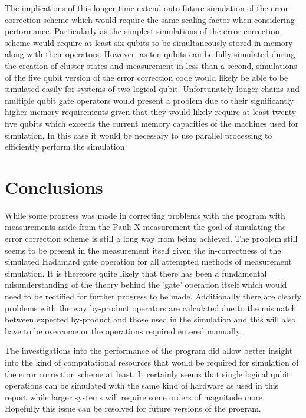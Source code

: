 The implications of this longer time extend onto future simulation of the error correction scheme which would require the same scaling factor when considering performance. Particularly as the simplest simulations of the error correction scheme would require at least six qubits to be simultaneously stored in memory along with their operators. However, as ten qubits can be fully simulated during the creation of cluster states and measurement in less than a second, simulations of the five qubit version of the error correction code would likely be able to be simulated easily for systems of two logical qubit. Unfortunately longer chains and multiple qubit gate operators would present a problem due to their significantly higher memory requirements given that they would likely require at least twenty five qubits which exceeds the current memory capacities of the machines used for simulation. In this case it would be necessary to use parallel processing to efficiently perform the simulation.



\section{Conclusions}


While some progress was made in correcting problems with the program with measurements aside from the Pauli X measurement the goal of simulating the error correction scheme is still a long way from being achieved. The problem still seems to be present in the measurement itself given the in-correctness of the simulated Hadamard gate operation for all attempted methods of measurement simulation. It is therefore quite likely that there has been a fundamental misunderstanding of the theory behind the 'gate' operation itself which would need to be rectified for further progress to be made. Additionally there are clearly problems with the way by-product operators are calculated due to the mismatch between expected by-product and those used in the simulation and this will also have to be overcome or the operations required entered manually.

The investigations into the performance of the program did allow better insight into the kind of computational resources that would be required for simulation of the error correction scheme at least. It certainly seems that single logical qubit operations can be simulated with the same kind of hardware as used in this report while larger systems will require some orders of magnitude more. Hopefully this issue can be resolved for future versions of the program.
